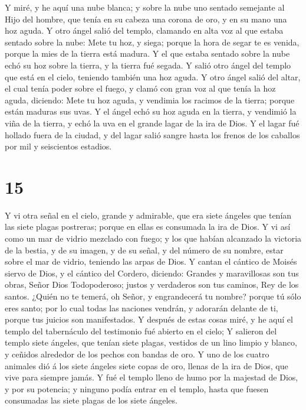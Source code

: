  Y miré, y he aquí una nube blanca; y sobre la nube uno
sentado semejante al Hijo del hombre, que tenía en su cabeza una corona
de oro, y en su mano una hoz aguda.  Y otro ángel salió
del templo, clamando en alta voz al que estaba sentado sobre la nube:
Mete tu hoz, y siega; porque la hora de segar te es venida, porque la
mies de la tierra está madura.  Y el que estaba sentado
sobre la nube echó su hoz sobre la tierra, y la tierra fué segada.
 Y salió otro ángel del templo que está en el cielo,
teniendo también una hoz aguda.  Y otro ángel salió del
altar, el cual tenía poder sobre el fuego, y clamó con gran voz al que
tenía la hoz aguda, diciendo: Mete tu hoz aguda, y vendimia los racimos
de la tierra; porque están maduras sus uvas.  Y el ángel
echó su hoz aguda en la tierra, y vendimió la viña de la tierra, y echó
la uva en el grande lagar de la ira de Dios.  Y el lagar
fué hollado fuera de la ciudad, y del lagar salió sangre hasta los
frenos de los caballos por mil y seiscientos estadios.

\hypertarget{section-14}{%
\section{15}\label{section-14}}

 Y vi otra señal en el cielo, grande y admirable, que era
siete ángeles que tenían las siete plagas postreras; porque en ellas es
consumada la ira de Dios.  Y vi así como un mar de vidrio
mezclado con fuego; y los que habían alcanzado la victoria de la bestia,
y de su imagen, y de su señal, y del número de su nombre, estar sobre el
mar de vidrio, teniendo las arpas de Dios.  Y cantan el
cántico de Moisés siervo de Dios, y el cántico del Cordero, diciendo:
Grandes y maravillosas son tus obras, Señor Dios Todopoderoso; justos y
verdaderos son tus caminos, Rey de los santos.  ¿Quién no
te temerá, oh Señor, y engrandecerá tu nombre? porque tú sólo eres
santo; por lo cual todas las naciones vendrán, y adorarán delante de ti,
porque tus juicios son manifestados.  Y después de estas
cosas miré, y he aquí el templo del tabernáculo del testimonio fué
abierto en el cielo;  Y salieron del templo siete ángeles,
que tenían siete plagas, vestidos de un lino limpio y blanco, y ceñidos
alrededor de los pechos con bandas de oro.  Y uno de los
cuatro animales dió á los siete ángeles siete copas de oro, llenas de la
ira de Dios, que vive para siempre jamás.  Y fué el templo
lleno de humo por la majestad de Dios, y por su potencia; y ninguno
podía entrar en el templo, hasta que fuesen consumadas las siete plagas
de los siete ángeles.

